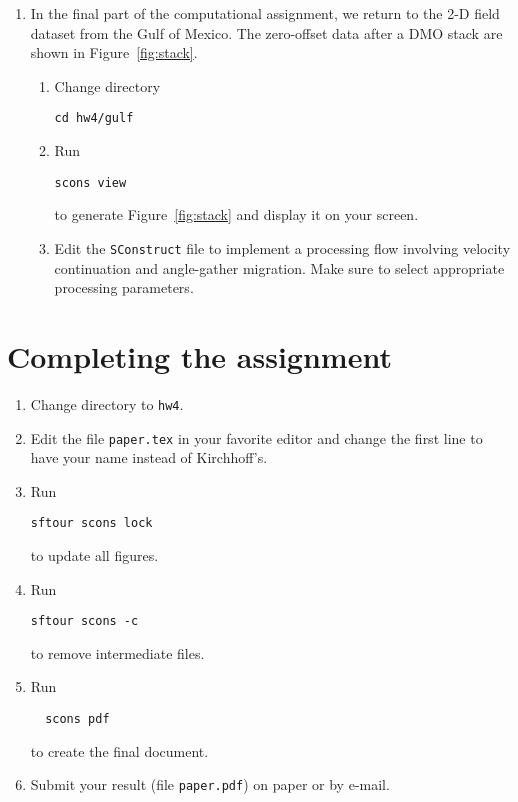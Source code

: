 \begin{enumerate}
\lstset{language=python,numbers=left,numberstyle=\tiny,showstringspaces=false}


\lstset{language=c,numbers=left,numberstyle=\tiny,showstringspaces=false}


\item In the final part of the computational assignment, we return to the 2-D field dataset from the Gulf of Mexico.
The zero-offset data after a DMO stack are shown in Figure~\ref{fig:stack}.


\begin{enumerate}
\item Change directory 
\begin{verbatim}
cd hw4/gulf
\end{verbatim}
\item Run
\begin{verbatim}
scons view
\end{verbatim}
to generate Figure~\ref{fig:stack} and display it on your screen.
\item Edit the \texttt{SConstruct} file to implement a processing flow involving velocity continuation and 
angle-gather migration. Make sure to select appropriate processing parameters.
\end{enumerate}

\newpage

\lstset{language=python,numbers=left,numberstyle=\tiny,showstringspaces=false}


\end{enumerate}

\newpage


\section{Completing the assignment}

\begin{enumerate}
\item Change directory to \texttt{hw4}.
\item Edit the file \texttt{paper.tex} in your favorite editor 
      and change the first line to have your name instead of Kirchhoff's.
\item Run
\begin{verbatim}
sftour scons lock
\end{verbatim}
to update all figures.
\item Run
\begin{verbatim}
sftour scons -c
\end{verbatim}
to remove intermediate files.
\item Run
\begin{verbatim} 
  scons pdf
\end{verbatim}
  to create the final document.
\item Submit your result (file \texttt{paper.pdf}) on paper or by
  e-mail. 
\end{enumerate}
